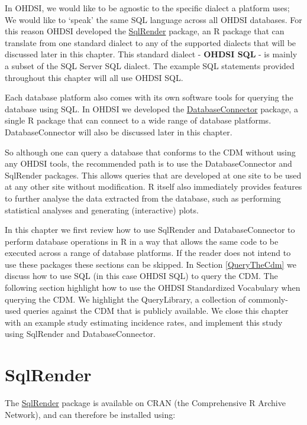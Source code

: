 \documentclass[11pt]{book}
\begin{document}
In OHDSI, we would like to be agnostic to the specific dialect a
platform uses; We would like to `speak' the same SQL language across all
OHDSI databases. For this reason OHDSI developed the
\href{https://ohdsi.github.io/SqlRender/}{SqlRender} package, an R
package that can translate from one standard dialect to any of the
supported dialects that will be discussed later in this chapter. This
standard dialect - \textbf{OHDSI SQL} - is mainly a subset of the SQL
Server SQL dialect. The example SQL statements provided throughout this
chapter will all use OHDSI SQL.

Each database platform also comes with its own software tools for
querying the database using SQL. In OHDSI we developed the
\href{https://ohdsi.github.io/DatabaseConnector/}{DatabaseConnector}
package, a single R package that can connect to a wide range of database
platforms. DatabaseConnector will also be discussed later in this
chapter.

So although one can query a database that conforms to the CDM without
using any OHDSI tools, the recommended path is to use the
DatabaseConnector and SqlRender packages. This allows queries that are
developed at one site to be used at any other site without modification.
R itself also immediately provides features to further analyse the data
extracted from the database, such as performing statistical analyses and
generating (interactive) plots.

In this chapter we first review how to use SqlRender and
DatabaseConnector to perform database operations in R in a way that
allows the same code to be executed across a range of database
platforms. If the reader does not intend to use these packages these
sections can be skipped. In Section \ref{QueryTheCdm} we discuss how to
use SQL (in this case OHDSI SQL) to query the CDM. The following section
highlight how to use the OHDSI Standardized Vocabulary when querying the
CDM. We highlight the QueryLibrary, a collection of commonly-used
queries against the CDM that is publicly available. We close this
chapter with an example study estimating incidence rates, and implement
this study using SqlRender and DatabaseConnector.

\section{SqlRender}\label{SqlRender}

The \href{https://ohdsi.github.io/SqlRender/}{SqlRender} package is
available on CRAN (the Comprehensive R Archive Network), and can
therefore be installed using:
\end{document}
